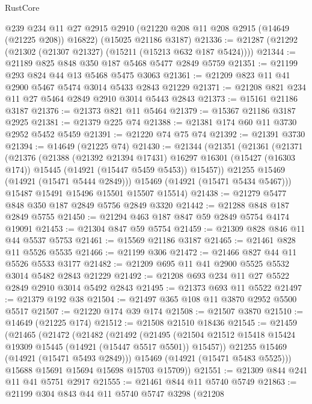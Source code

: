 \begin{lexlean}{RustCore}
\begin{coremodule}
    @239
    @234
    @11
    @27
    @2915
    @2910
    (@21220 @208 @11 @208 @2915 (@14649 (@21225 @208)) @16822)
    (@15025 @21186 @3187)
@21336 := @21287 (@21292 (@21302 (@21307 @21327) (@15211 (@15213 @632 @187 @5424))))
@21344 := @21189 @825 @848 @350 @187 @5468 @5477 @2849 @5759
@21351 := @21199 @293 @824 @44 @13 @5468 @5475 @3063
@21361 := @21209 @823 @11 @41 @2900 @5467 @5474 @3014 @5433 @2843 @21229
@21371 := @21208 @821 @234 @11 @27 @5464 @2849 @2910 @3014 @5443 @2843
@21373 := @15161 @21186 @3187
@21376 := @21373 @821 @11 @5464
@21379 := @15367 @21186 @3187 @2925
@21381 := @21379 @225 @74
@21388 := @21381 @174 @60 @11 @3730 @2952 @5452 @5459
@21391 := @21220 @74 @75 @74
@21392 := @21391 @3730
@21394 := @14649 (@21225 @74)
@21430 := @21344
    (@21351
      (@21361
        (@21371
          (@21376
            (@21388
              (@21392 @21394 @17431)
              @16297
              @16301
              (@15427 (@16303 @174))
              @15445
              (@14921 (@15447 @5459 @5453))
              @15457))
          @21255
          @15469
          (@14921 (@15471 @5444 @2849)))
        @15469
        (@14921 (@15471 @5434 @5467)))
      @15487
      @15491
      @15496
      @15501
      @15507
      @15514)
@21438 := @21279 @5477 @848 @350 @187 @2849 @5756 @2849 @3320
@21442 := @21288 @848 @187 @2849 @5755
@21450 := @21294 @463 @187 @847 @59 @2849 @5754 @4174 @19091
@21453 := @21304 @847 @59 @5754
@21459 := @21309 @828 @846 @11 @44 @5537 @5753
@21461 := @15569 @21186 @3187
@21465 := @21461 @828 @11 @5526 @5535
@21466 := @21199 @306
@21472 := @21466 @827 @44 @11 @5526 @5533 @3177
@21482 := @21209 @695 @11 @41 @2900 @5525 @5532 @3014 @5482 @2843 @21229
@21492 := @21208 @693 @234 @11 @27 @5522 @2849 @2910 @3014 @5492 @2843
@21495 := @21373 @693 @11 @5522
@21497 := @21379 @192 @38
@21504 := @21497 @365 @108 @11 @3870 @2952 @5500 @5517
@21507 := @21220 @174 @39 @174
@21508 := @21507 @3870
@21510 := @14649 (@21225 @174)
@21512 := @21508 @21510 @18436
@21545 := @21459
    (@21465
      (@21472
        (@21482
          (@21492
            (@21495
              (@21504 @21512 @15418 @15424 @19309 @15445 (@14921 (@15447 @5517 @5501)) @15457))
            @21255
            @15469
            (@14921 (@15471 @5493 @2849)))
          @15469
          (@14921 (@15471 @5483 @5525)))
        @15688
        @15691
        @15694
        @15698
        @15703
        @15709))
@21551 := @21309 @844 @241 @11 @41 @5751 @2917
@21555 := @21461 @844 @11 @5740 @5749
@21863 := @21199
    @304
    @843
    @44
    @11
    @5740
    @5747
    @3298
    (@21208

\end{coremodule}
\end{lexlean}
